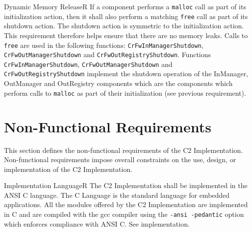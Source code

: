 \documentclass[a4paper,10pt]{article}
\let\stdsection\section
\renewcommand\section{\newpage\stdsection}
\newenvironment{fw_req}[6]
{\addtocounter{subsubsection}{1}
	\hspace{0.2cm}\textbf{CR-\arabic{section}.\arabic{subsection}.\arabic{subsubsection}/#2
	\hspace{0.8cm} #1}
	\vspace{-10pt}
\begin{longtable}{p{2.7cm}P{8.5cm}}
\hline
\textsc{Requirement} & #3 \\
\textsc{Justification} & #4 \\
\textsc{Implementation} & #5  \\ 
\textsc{Verification} & #6  \\
\hline
}
{\end{longtable}}
\begin{document}
\begin{fw_req}{Dynamic Memory Release}{R}
{If a component performs a \texttt{malloc} call as part of its initialization action, then it shall also perform a matching \texttt{free} call as part of its shutdown action.}
{The shutdown action is symmetric to the initialization action. This requirement therefore helps ensure that there are no memory leaks.}
{Calls to \texttt{free} are used in the following functions: \texttt{CrFwInManagerShutdown}, \texttt{CrFwOutManagerShutdown} and \texttt{CrFwOutRegistryShutdown}.   } 
{Functions \texttt{CrFwInManagerShutdown}, \texttt{CrFwOutManagerShutdown} and \texttt{CrFwOutRegistryShutdown} implement the shutdown operation of the InManager, OutManager and OutRegistry components which are the components which perform calls to \texttt{malloc} as part of their initialization (see previous requirement).}
\end{fw_req}









\section{Non-Functional Requirements}

This section defines the non-functional requirements of the C2 Implementation. Non-functional requirements impose overall constraints on the use, 
design, or implementation of the C2 Implementation.

\label{req:codingReqs}

\begin{fw_req}{Implementation Language}{R}
{The C2 Implementation shall be implemented in the ANSI C language.}
{The C Language is the standard language for embedded applications.}
{All the modules offered by the C2 Implementation are implemented in C and are compiled with the gcc compiler using the \texttt{-ansi -pedantic} option which enforces compliance with ANSI C.} 
{See implementation.}
\end{fw_req}
\end{document}
